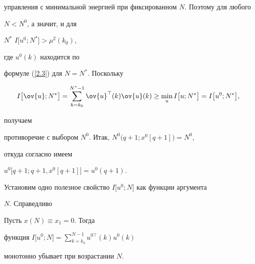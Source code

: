 \begin{pf}
управления с минимальной энергией при фиксированном $N$. Поэтому для любого


$N<N^0$, а значит, и для


$N^{\ast}$\; $I\bigl[u^0; N^{\ast}\bigr]>\mu^2(k_0)$,


где $u^0(k)$ находится по


формуле (\ref{2.3}) для $N=N^{\ast}$. Поскольку


$$


I\bigl[\ov{u}; N^{\ast}\bigr]=


\sum_{k=k_0}^{N^{\ast}-1}\ov{u}^{\top}(k) \ov{u}(k)\ge


\min_u I\bigl[u; N^{\ast}\bigr]=I\bigl[u^0; N^{\ast}\bigr],


$$


получаем


противоречие с выбором $N^0$. Итак, $N^0\bigl(q+1; x^0[q+1]\bigr)=N^0$,


откуда согласно \cite{2} имеем


$u^0\bigl[q+1; q+1, x^0[q+1]\bigr]=u^0(q +1)$.


\end{pf}





Установим одно полезное свойство $I\bigl[u^0; N\bigr]$ как функции аргумента


$N$. Справедливо





\begin{props}


Пусть $x(N)\equiv x_1=0$. Тогда


функция $I\bigl[u^0; N\bigr]=\sum\limits_{k=k_0}^{N-1} u^{0 \top}(k) u^0(k)$


монотонно убывает при возрастании $N$.


\end{props}





